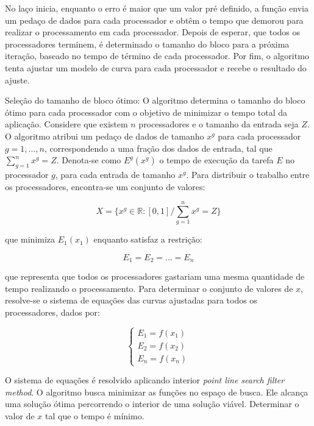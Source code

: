 No laço inicia, enquanto o erro é maior que um valor pré definido, a função envia um pedaço de dados para cada processador e obtêm o tempo que demorou para realizar o processamento em cada processador. Depois de esperar, que todos os processadores terminem, é determinado o tamanho do bloco para a próxima iteração, baseado no tempo de término de cada processador. Por fim, o algoritmo tenta ajustar um modelo de curva para cada processador e recebe o resultado do ajuste.

Seleção do tamanho de bloco ótimo: O algoritmo determina o tamanho do bloco ótimo para cada processador com o objetivo de minimizar o  tempo total da aplicação. Considere que existem $n$ processadores e o tamanho da entrada seja $Z$. O algoritmo atribui um pedaço de dados de tamanho $x^g$ para cada processador $g= 1,..., n$, correspondendo a uma fração dos dados de entrada, tal que $\sum_{g=1}^n x^g = Z$. Denota-se como $E^g(x^g)$ o tempo de execução da tarefa $E$ no processador $g$, para cada entrada de tamanho $x^g$. Para distribuir o trabalho entre os processadores, encontra-se um conjunto de valores:

\begin{equation}
	X = \{ x^g \in \mathbb{R}:[0,1] / \sum_{g=1}^n x^g = Z \}
	\label{eq: totalResultado}
\end{equation}

que minimiza $E_1(x_1)$ enquanto satisfaz a restrição:

\begin{equation}
	E_{1} = E_{2} = ...= E_{n}
	\label{eq: Restricao}
\end{equation}
 
que representa que todos os processadores gastariam uma mesma quantidade de tempo realizando o processamento. Para determinar o conjunto de valores de $x$, resolve-se o sistema de equações das curvas ajustadas para todos os processadores, dados por:

\begin{equation}
	\left\lbrace
	\begin{array}{ll}
		\displaystyle E_{1} = f(x_{1})  \\
		\displaystyle E_{2} = f(x_{2})   \\
		\displaystyle E_{n} = f(x_{n}) 
		\label{eq: system}
	\end{array}
	\right.
\end{equation}

O sistema de equações é resolvido aplicando interior \emph{point line search filter method}. O algoritmo busca minimizar as funções no espaço de busca. Ele alcança uma solução ótima percorrendo o interior de uma solução viável. Determinar o valor de $x$ tal que o tempo é mínimo.

